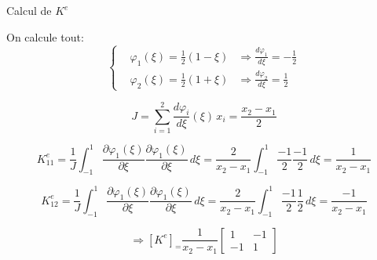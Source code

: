 \documentclass[
mode=present,    %
paper=a4paper,   %
orient=landscape,
display=slides,   %
size=10pt,     %
style=romain   %
]{powerdot}
\begin{document}
\begin{slide}[toc=]{Calcul de $K^e$}

On calcule tout:
\begin{equation*}
    \left\{
        \begin{aligned}
            &\varphi_1(\xi) = \frac{1}{2} (1-\xi)  & \Rightarrow  \frac{d \varphi_1}{d\xi} = -\frac{1}{2}\\
            &\varphi_2(\xi) = \frac{1}{2} (1+\xi)  & \Rightarrow  \frac{d \varphi_2}{d\xi} =  \frac{1}{2}
        \end{aligned}
    \right.
\end{equation*}

\begin{equation*}
    J = \sum_{i=1}^2 \frac{d \varphi_i}{d\xi}(\xi)\, x_i = \frac{x_2-x_1}{2}
\end{equation*}

\begin{equation*}
    K^e_{11} = \frac{1}{J} \int_{-1}^{1} \frac{\partial\varphi_1(\xi)}{\partial \xi}
    \frac{\partial\varphi_1(\xi)}{\partial \xi}\, d\xi
    = \frac{2}{x_2-x_1} \int_{-1}^{1} \frac{-1}{2}\frac{-1}{2} \,d\xi = \frac{1}{x_2-x_1}
\end{equation*}

\begin{equation*}
    K^e_{12} = \frac{1}{J} \int_{-1}^{1} \frac{\partial\varphi_1(\xi)}{\partial \xi}
    \frac{\partial\varphi_1(\xi)}{\partial \xi}\, d\xi
    = \frac{2}{x_2-x_1} \int_{-1}^{1} \frac{-1}{2}\frac{1}{2} \,d\xi = \frac{-1}{x_2-x_1}
\end{equation*}

\bigskip

\begin{equation*}
    \Rightarrow [K^e]_ = \frac{1}{x_2-x_1}
     \begin{bmatrix}
        1 & -1\\
        -1 & 1
    \end{bmatrix}
\end{equation*}

\end{slide}
\end{document}
